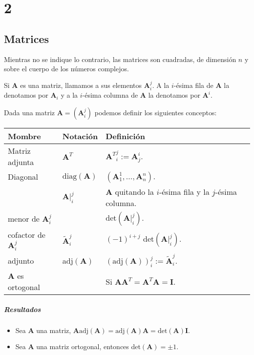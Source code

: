 \chapter{2}\label{ch:2}
\section{Matrices}

Mientras no se indique lo contrario, las matrices son cuadradas, de dimensión $n$ y sobre el cuerpo de los números complejos.

Si $\mathbf{A}$ es una matriz, llamamos a sus elementos $\mathbf{A}_i^j$. A la $i$-ésima fila de $\mathbf{A}$ la denotamos por $\mathbf{A}_i$ y a la $i$-ésima columna de $\mathbf{A}$ la denotamos por $\mathbf{A}^i$.

Dada una matriz $\mathbf{A}=(\mathbf{A}_i^j)$ podemos definir los siguientes conceptos:
\begin{tabular}{l|l|l}
	Mombre & Notación & Definición \\
	\hline
	Matriz adjunta & $\mathbf{A}^T$ & ${\mathbf{A}^T}_i^j := \mathbf{A}_j^i$. \\
	Diagonal & $\text{diag}(\mathbf{A})$ & $(\mathbf{A}_1^1, \dots, \mathbf{A}_n^n)$. \\
	& $\mathbf{A}|_i^j$ & $\mathbf{A}$ quitando la $i$-ésima fila y la $j$-ésima columna. \\
	menor de $\mathbf{A}_i^j$ & & det$(\mathbf{A}|_i^j)$. \\
	cofactor de $\mathbf{A}_i^j$ & $\mathbf{\tilde{A}}_i^j$ & $(-1)^{i+j}$ det$(\mathbf{A}|_i^j)$. \\
	adjunto & adj$(\mathbf{A})$ & $(\text{adj}(\mathbf{A}))_i^j := \mathbf{\tilde{A}}_i^j$. \\
	$\mathbf{A}$ es ortogonal & & Si $\mathbf{A}\mathbf{A}^T=\mathbf{A}^T\mathbf{A}=\mathbf{I}$.
\end{tabular}

\paragraph{Resultados}
\begin{itemize}
	\item Sea $\mathbf{A}$ una matriz, $\mathbf{A}\text{adj}(\mathbf{A}) = \text{adj}(\mathbf{A})\mathbf{A}=\text{det}(\mathbf{A})\mathbf{I}$.
	\item Sea $\mathbf{A}$ una matriz ortogonal, entonces det$(\mathbf{A})=\pm1$.
\end{itemize}
